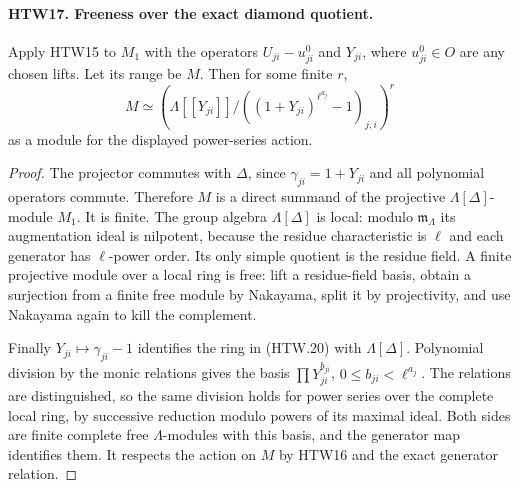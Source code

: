 \documentclass[11pt,a4paper]{article}
\numberwithin{equation}{section}
\theoremstyle{remark}\newtheorem{remark}[theorem]{Remark}
\begin{document}
\paragraph{HTW17. Freeness over the exact diamond quotient.}
\label{claim:HTW17}
Apply HTW15 to \(M_1\) with the operators
\(U_{ji}-u^0_{ji}\) and \(Y_{ji}\), where \(u^0_{ji}\in O\)
are any chosen lifts.  Let its range be \(M\).
Then for some finite \(r\),
\[
 M\simeq\left(
  \Lambda[[Y_{ji}]]/
       ((1+Y_{ji})^{\ell^{a_j}}-1)_{j,i}
                   \right)^r
 \tag{HTW.20}
\]
as a module for the displayed power-series action.
\begin{proof}
The projector commutes with \(\Delta\), since
\(\gamma_{ji}=1+Y_{ji}\) and all polynomial operators
commute.  Therefore \(M\) is a direct summand of
the projective \(\Lambda[\Delta]\)-module \(M_1\).
It is finite.  The group algebra \(\Lambda[\Delta]\)
is local: modulo \(\mathfrak m_\Lambda\) its augmentation
ideal is nilpotent, because the residue characteristic
is \(\ell\) and each generator has \(\ell\)-power order.
Its only simple quotient is the residue field.
A finite projective module over a local ring is free:
lift a residue-field basis, obtain a surjection from
a finite free module by Nakayama, split it by
projectivity, and use Nakayama again to kill the
complement.

Finally \(Y_{ji}\mapsto\gamma_{ji}-1\) identifies
the ring in (HTW.20) with \(\Lambda[\Delta]\).
Polynomial division by the monic relations gives
the basis \(\prod Y_{ji}^{b_{ji}}\), \(0\le b_{ji}<\ell^{a_j}\).
The relations are distinguished, so the same division
holds for power series over the complete local ring,
by successive reduction modulo powers of its maximal
ideal.  Both sides are finite complete free
\(\Lambda\)-modules with this basis, and the generator
map identifies them.  It respects the action on \(M\)
by HTW16 and the exact generator relation.
\end{proof}

\end{document}
